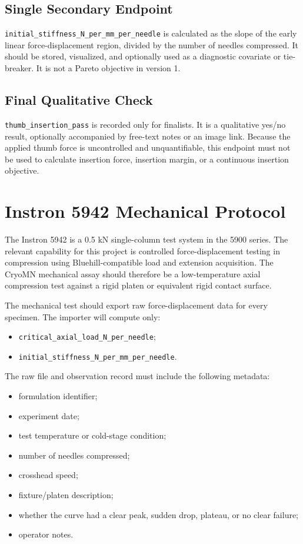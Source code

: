 \documentclass[11pt]{article}
\newcommand{\metric}[1]{\texttt{#1}}
\begin{document}
\subsection{Single Secondary Endpoint}

\metric{initial\_stiffness\_N\_per\_mm\_per\_needle} is calculated as the slope of
the early linear force-displacement region, divided by the number of needles
compressed. It should be stored, visualized, and optionally used as a diagnostic
covariate or tie-breaker. It is not a Pareto objective in version 1.

\subsection{Final Qualitative Check}

\metric{thumb\_insertion\_pass} is recorded only for finalists. It is a qualitative
yes/no result, optionally accompanied by free-text notes or an image link. Because the
applied thumb force is uncontrolled and unquantifiable, this endpoint must not be used
to calculate insertion force, insertion margin, or a continuous insertion objective.

\section{Instron 5942 Mechanical Protocol}

The Instron 5942 is a 0.5 kN single-column test system in the 5900 series. The relevant
capability for this project is controlled force-displacement testing in compression
using Bluehill-compatible load and extension acquisition. The CryoMN mechanical assay
should therefore be a low-temperature axial compression test against a rigid platen or
equivalent rigid contact surface.

The mechanical test should export raw force-displacement data for every specimen.
The importer will compute only:
\begin{itemize}
    \item \metric{critical\_axial\_load\_N\_per\_needle};
    \item \metric{initial\_stiffness\_N\_per\_mm\_per\_needle}.
\end{itemize}

The raw file and observation record must include the following metadata:
\begin{itemize}
    \item formulation identifier;
    \item experiment date;
    \item test temperature or cold-stage condition;
    \item number of needles compressed;
    \item crosshead speed;
    \item fixture/platen description;
    \item whether the curve had a clear peak, sudden drop, plateau, or no clear failure;
    \item operator notes.
\end{itemize}
\end{document}
